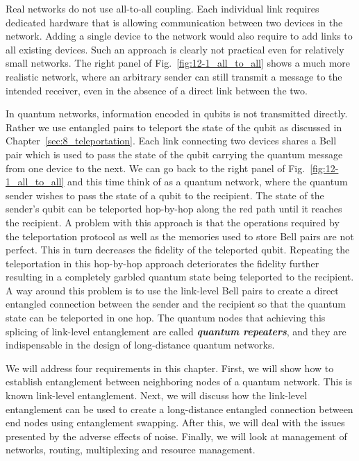 Real networks do not use all-to-all coupling.
Each individual link requires dedicated hardware that is allowing communication between two devices in the network.
Adding a single device to the network would also require to add links to all existing devices.
Such an approach is clearly not practical even for relatively small networks.
The right panel of Fig.~\ref{fig:12-1_all_to_all} shows a much more realistic network, where an arbitrary sender can still transmit a message to the intended receiver, even in the absence of a direct link between the two.

In quantum networks, information encoded in qubits is not transmitted directly.
Rather we use entangled pairs to teleport the state of the qubit as discussed in Chapter~\ref{sec:8_teleportation}.
Each link connecting two devices shares a Bell pair which is used to pass the state of the qubit carrying the quantum message from one device to the next.
We can go back to the right panel of Fig.~\ref{fig:12-1_all_to_all} and this time think of as a quantum network, where the quantum sender wishes to pass the state of a qubit to the recipient.
The state of the sender's qubit can be teleported hop-by-hop along the red path until it reaches the recipient.
A problem with this approach is that the operations required by the teleportation protocol as well as the memories used to store Bell pairs are not perfect.
This in turn decreases the fidelity of the teleported qubit.
Repeating the teleportation in this hop-by-hop approach deteriorates the fidelity further resulting in a completely garbled quantum state being teleported to the recipient.
A way around this problem is to use the link-level Bell pairs to create a direct entangled connection between the sender and the recipient so that the quantum state can be teleported in one hop.
The quantum nodes that achieving this splicing of link-level entanglement are called \textit{\textbf{quantum repeaters}}, and they are indispensable in the design of long-distance quantum networks.

We will address four requirements in this chapter.
First, we will show how to establish entanglement between neighboring nodes of a quantum network. This is known link-level entanglement.
Next, we will discuss how the link-level entanglement can be used to create a long-distance entangled connection between end nodes using entanglement swapping.
After this, we will deal with the issues presented by the adverse effects of noise.
Finally, we will look at management of networks, routing, multiplexing and resource management.


